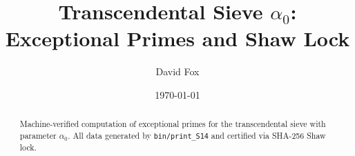 \documentclass{article}
\title{Transcendental Sieve $\alpha_0$: Exceptional Primes and Shaw Lock}
\author{David Fox}
\date{\today}
\theoremstyle{plain}
\theoremstyle{definition}
\theoremstyle{remark}
\begin{document}
\maketitle

\begin{abstract}
Machine-verified computation of exceptional primes for the transcendental sieve with parameter $\alpha_0$. 
All data generated by \verb|bin/print_S14| and certified via SHA-256 Shaw lock.
\end{abstract}



\end{document}
